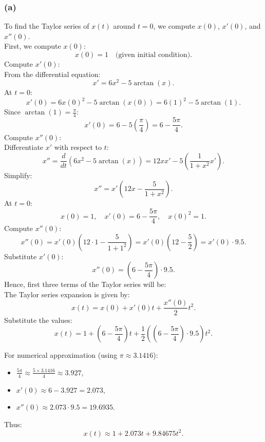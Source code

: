 \documentclass{article}
\begin{document}
\subsubsection*{(a)}
To find the Taylor series of \( x(t) \) around \( t = 0 \), we compute \( x(0) \), \( x'(0) \), and \( x''(0) \).
\\
First, we compute \( x(0) \):
\[
    x(0) = 1 \quad \text{(given initial condition)}.
\]
Compute \( x'(0) \):
\\
From the differential equation:
\[
    x' = 6x^2 - 5 \arctan(x).
\]
At \( t = 0 \):
\[
    x'(0) = 6x(0)^2 - 5 \arctan(x(0)) = 6(1)^2 - 5 \arctan(1).
\]
Since \( \arctan(1) = \frac{\pi}{4} \):
\[
    x'(0) = 6 - 5 \left( \frac{\pi}{4} \right) = 6 - \frac{5\pi}{4}.
\]
Compute \( x''(0) \):
\\
Differentiate \( x' \) with respect to \( t \):
\[
    x'' = \frac{d}{dt} \left( 6x^2 - 5 \arctan(x) \right) = 12x x' - 5 \left( \frac{1}{1 + x^2} x' \right).
\]
Simplify:
\[
    x'' = x' \left( 12x - \frac{5}{1 + x^2} \right).
\]
At \( t = 0 \):
\[
    x(0) = 1, \quad x'(0) = 6 - \frac{5\pi}{4}, \quad x(0)^2 = 1.
\]
Compute \( x''(0) \):
\[
    x''(0) = x'(0) \left( 12 \cdot 1 - \frac{5}{1 + 1^2} \right) = x'(0) \left( 12 - \frac{5}{2} \right) = x'(0) \cdot 9.5.
\]
Substitute \( x'(0) \):
\[
    x''(0) = \left( 6 - \frac{5\pi}{4} \right) \cdot 9.5.
\]
\noindent Hence, first three terms of the Taylor series will be:
\\
The Taylor series expansion is given by:
\[
    x(t) = x(0) + x'(0) t + \frac{x''(0)}{2} t^2.
\]
Substitute the values:
\[
    x(t) = 1 + \left( 6 - \frac{5\pi}{4} \right) t + \frac{1}{2} \left( \left( 6 - \frac{5\pi}{4} \right) \cdot 9.5 \right) t^2.
\]

For numerical approximation (using \( \pi \approx 3.1416 \)):

\begin{itemize}
    \item \( \frac{5\pi}{4} \approx \frac{5 \times 3.1416}{4} \approx 3.927 \),
    \item \( x'(0) \approx 6 - 3.927 = 2.073 \),
    \item \( x''(0) \approx 2.073 \cdot 9.5 = 19.6935 \).
\end{itemize}

Thus:
\[
x(t) \approx 1 + 2.073 t + 9.84675 t^2.
\]
\end{document}
